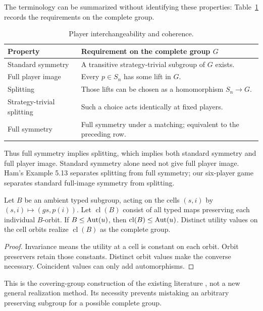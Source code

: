 The terminology can be summarized without identifying these properties:
Table~\ref{tab:hierarchy} records the requirements on the complete group.
\begin{table}[htbp]
\centering
\caption{Player interchangeability and coherence.}\label{tab:hierarchy}
\begin{tabular}{p{.28\linewidth}p{.61\linewidth}}
\toprule
Property & Requirement on the complete group $G$\\\midrule
Standard symmetry & A transitive strategy-trivial subgroup of $G$ exists.\\
Full player image & Every $p\in S_n$ has some lift in $G$.\\
Splitting & Those lifts can be chosen as a homomorphism $S_n\to G$.\\
Strategy-trivial splitting & Such a choice acts identically at fixed players.\\
Full symmetry & Full symmetry under a matching; equivalent to the preceding row.\\\bottomrule
\end{tabular}
\end{table}
Thus full symmetry implies splitting, which implies both standard symmetry
and full player image. Standard symmetry alone need not give full player
image. Ham's Example 5.13 separates splitting from full symmetry; our
six-player game separates standard full-image symmetry from splitting.

\begin{lemma}\label{lem:closure}
Let $B$ be an ambient typed subgroup, acting on the cells $(s,i)$ by
$(s,i)\mapsto(gs,p(i))$. Let $\operatorname{cl}(B)$ consist of all typed maps
preserving each individual $B$-orbit. If $B\le\operatorname{Aut}(u)$, then
$\operatorname{cl}(B)\le\operatorname{Aut}(u)$. Distinct utility values on the cell orbits
realize $\operatorname{cl}(B)$ as the complete group.
\end{lemma}
\begin{proof}
Invariance means the utility at a cell is constant on each orbit. Orbit
preservers retain those constants. Distinct orbit values make the converse
necessary. Coincident values can only add automorphisms.
\end{proof}
This is the covering-group construction of the existing literature
\citep{cao2024}, not a new general realization method. Its necessity prevents
mistaking an arbitrary preserving subgroup for a possible complete group.
